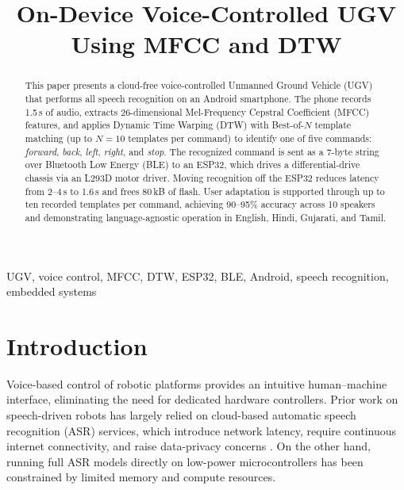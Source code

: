 \documentclass[conference]{IEEEtran}
\begin{document}
\title{On-Device Voice-Controlled UGV\\
Using MFCC and DTW}

\author{
}

\maketitle

\begin{abstract}
This paper presents a cloud-free voice-controlled Unmanned Ground
Vehicle (UGV) that performs all speech recognition on an Android
smartphone. The phone records 1.5\,s of audio, extracts
26-dimensional Mel-Frequency Cepstral Coefficient (MFCC) features,
and applies Dynamic Time Warping (DTW) with Best-of-$N$ template
matching (up to $N=10$ templates per command) to identify one of five commands: \textit{forward},
\textit{back}, \textit{left}, \textit{right}, and \textit{stop}.
The recognized command is sent as a 7-byte string over Bluetooth
Low Energy (BLE) to an ESP32, which drives a differential-drive
chassis via an L293D motor driver. Moving recognition off the ESP32
reduces latency from 2--4\,s to 1.6\,s and frees 80\,kB of flash.
User adaptation is supported through up to ten recorded templates
per command, achieving 90--95\% accuracy across 10 speakers and demonstrating
language-agnostic operation in English, Hindi, Gujarati, and Tamil.
\end{abstract}

\begin{IEEEkeywords}
UGV, voice control, MFCC, DTW, ESP32, BLE, Android, speech recognition,
embedded systems
\end{IEEEkeywords}

\section{Introduction} \label{sec:intro}

Voice-based control of robotic platforms provides an intuitive
human--machine interface, eliminating the need for dedicated hardware
controllers. Prior work on speech-driven robots has largely relied on
cloud-based automatic speech recognition (ASR) services, which
introduce network latency, require continuous internet connectivity,
and raise data-privacy concerns \cite{li2017speech}. On the other hand,
running full ASR models directly on low-power microcontrollers has been
constrained by limited memory and compute resources.
\end{document}

